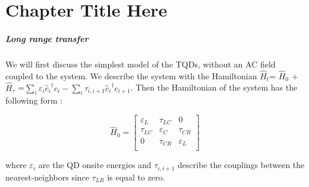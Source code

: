 
\chapter{Chapter Title Here} %

\label{Chapter1} %


\newcommand{\keyword}[1]{\textbf{#1}}
\newcommand{\tabhead}[1]{\textbf{#1}}
\newcommand{\code}[1]{\texttt{#1}}
\newcommand{\file}[1]{\texttt{\bfseries#1}}
\newcommand{\option}[1]{\texttt{\itshape#1}}




\paragraph{Long range transfer}

We will first discuss the simplest model of the TQDs, without an AC field coupled to the system. We describe the system with the Hamiltonian $\widehat{H}_{t}$= $\widehat{H}_{0}$ +$\widehat{H}_{\tau}$ =$\sum_{i} \varepsilon_{i}{\widehat{c}_{i}}^{\dagger} c_{i} - \sum_{i} \tau_{i,i+1}{\widehat{c}_{i}}^{\dagger} c_{i+1}$. Then the Hamiltonian of the system has the following form : 

\begin{equation} \label{eq:1}
\widehat{H}_{0}=\begin{bmatrix}
\varepsilon_{L} & \tau_{LC} & 0 \\
\tau_{LC} & \varepsilon_{C}  & \tau_{CR} \\    
0 & \tau_{CR} & \varepsilon_{L} \\
\end{bmatrix} 
\end{equation}
 
 where $\varepsilon_{i}$ are the QD onsite energies and $\tau_{i,i+1}$ describe the couplings between the nearest-neighbors since $\tau_{LR}$ is equal to zero. 
 
